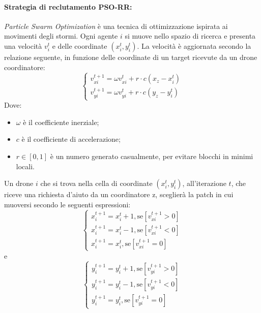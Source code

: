 \paragraph{Strategia di reclutamento PSO-RR:} \textit{Particle Swarm Optimization} è una tecnica di ottimizzazione ispirata ai movimenti degli stormi.
Ogni agente $i$ si muove nello spazio di ricerca e presenta una velocità $v_{i}^{t}$ e delle coordinate $(x_{i}^{t},y_{i}^{t})$.
La velocità è aggiornata secondo la relazione seguente, in funzione delle coordinate di un target ricevute da un drone coordinatore:
\begin{equation}
    \begin{cases}
        v_{xi}^{t+1} = \omega v_{xi}^{t} + r \cdot c(x_{z} - x_{i}^{t}) \\
        v_{yi}^{t+1} = \omega v_{yi}^{t} + r \cdot c(y_{z} - y_{i}^{t})    
    \end{cases}    
\end{equation}
Dove:
\begin{itemize}
    \item $\omega$ è il coefficiente inerziale;
    \item $c$ è il coefficiente di accelerazione;
    \item $r \in [0,1]$ è un numero generato casualmente, per evitare blocchi in minimi locali.
\end{itemize}

Un drone $i$ che si trova nella cella di coordinate $(x_{i}^{t},y_{i}^{t})$, all'iterazione $t$, che riceve una richiesta d'aiuto da un coordinatore z, sceglierà la patch in cui muoversi secondo le seguenti espressioni:
\begin{equation}
    \begin{cases}
        x_{i}^{t+1} = x_{i}^{t} + 1 , \text{se}[v_{xi}^{t+1} > 0]\\
        x_{i}^{t+1} = x_{i}^{t} - 1 , \text{se}[v_{xi}^{t+1} < 0]\\
        x_{i}^{t+1} = x_{i}^{t} , \text{se}[v_{xi}^{t+1} = 0]
    \end{cases}
\end{equation}
e
\begin{equation}
    \begin{cases}
        y_{i}^{t+1} = y_{i}^{t} + 1 , \text{se}[v_{yi}^{t+1} > 0]\\
        y_{i}^{t+1} = y_{i}^{t} - 1 , \text{se}[v_{yi}^{t+1} < 0]\\
        y_{i}^{t+1} = y_{i}^{t} , \text{se}[v_{yi}^{t+1} = 0]
    \end{cases}
\end{equation}

